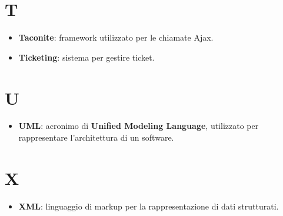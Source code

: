 \section*{T}
\begin{itemize}
\item \textbf{Taconite}: framework utilizzato per le chiamate Ajax.
\item \textbf{Ticketing}: sistema per gestire ticket.
\end{itemize}

\section*{U}
\begin{itemize}
\item \textbf{UML}: acronimo di \textbf{Unified Modeling Language}, utilizzato per rappresentare l'architettura di un software.
\end{itemize}


\section*{X}
\begin{itemize}
\item \textbf{XML}: linguaggio di markup per la rappresentazione di dati strutturati.
\end{itemize}